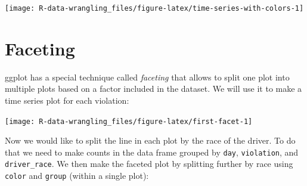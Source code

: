 \documentclass[]{book}
\newenvironment{Shaded}{\begin{snugshade}}{\end{snugshade}}
\newcommand{\KeywordTok}[1]{\textcolor[rgb]{0.13,0.29,0.53}{\textbf{#1}}}
\newcommand{\DataTypeTok}[1]{\textcolor[rgb]{0.13,0.29,0.53}{#1}}
\newcommand{\StringTok}[1]{\textcolor[rgb]{0.31,0.60,0.02}{#1}}
\newcommand{\OtherTok}[1]{\textcolor[rgb]{0.56,0.35,0.01}{#1}}
\newcommand{\OperatorTok}[1]{\textcolor[rgb]{0.81,0.36,0.00}{\textbf{#1}}}
\newcommand{\NormalTok}[1]{#1}
\theoremstyle{definition}
\theoremstyle{definition}
\theoremstyle{definition}
\theoremstyle{remark}
\begin{document}
\texttt{[image: R-data-wrangling\_files/figure-latex/time-series-with-colors-1]}

\section{Faceting}\label{faceting}

ggplot has a special technique called \emph{faceting} that allows to
split one plot into multiple plots based on a factor included in the
dataset. We will use it to make a time series plot for each violation:

\begin{Shaded}
\end{Shaded}

\texttt{[image: R-data-wrangling\_files/figure-latex/first-facet-1]}

Now we would like to split the line in each plot by the race of the
driver. To do that we need to make counts in the data frame grouped by
\texttt{day}, \texttt{violation}, and \texttt{driver\_race}. We then
make the faceted plot by splitting further by race using \texttt{color}
and \texttt{group} (within a single plot):

\begin{Shaded}
\end{Shaded}
\end{document}
